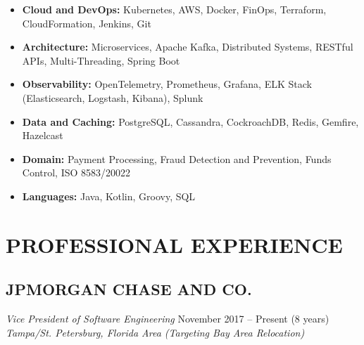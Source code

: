 \documentclass[10pt,letterpaper]{article}
\newcommand{\experience}[5]{
  \subsection*{#1}
  \textit{#2} \hfill #3\\
  \textit{#4} \hfill #5
  \vspace{2pt}
}
\begin{document}
\begin{itemize}[leftmargin=0pt,itemsep=2pt,topsep=2pt,parsep=0pt]
  \item \textbf{Cloud and DevOps:} Kubernetes, AWS, Docker, FinOps, Terraform, CloudFormation, Jenkins, Git
  
  \item \textbf{Architecture:} Microservices, Apache Kafka, Distributed Systems, RESTful APIs, Multi-Threading, Spring Boot
  
  \item \textbf{Observability:} OpenTelemetry, Prometheus, Grafana, ELK Stack (Elasticsearch, Logstash, Kibana), Splunk
  
  \item \textbf{Data and Caching:} PostgreSQL, Cassandra, CockroachDB, Redis, Gemfire, Hazelcast
  
  \item \textbf{Domain:} Payment Processing, Fraud Detection and Prevention, Funds Control, ISO 8583/20022
  
  \item \textbf{Languages:} Java, Kotlin, Groovy, SQL
\end{itemize}

\vspace{-4pt}

\section*{PROFESSIONAL EXPERIENCE}

\experience
  {JPMORGAN CHASE AND CO.}
  {Vice President of Software Engineering}
  {November 2017 -- Present (8 years)}
  {Tampa/St. Petersburg, Florida Area (Targeting Bay Area Relocation)}
  {}
\end{document}
